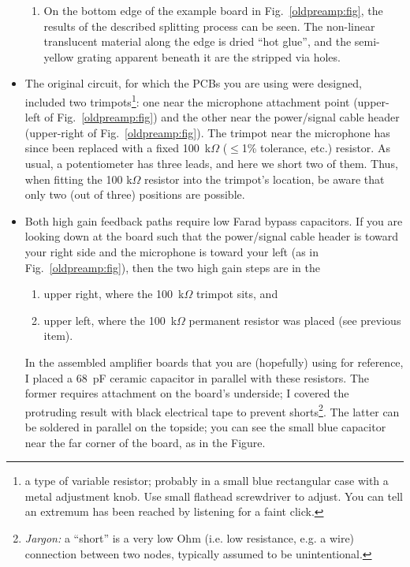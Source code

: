 \documentclass[letterpaper]{article}
\begin{document}
\begin{itemize}
\begin{enumerate}
\item On the bottom edge of the example board in
  Fig.~\ref{oldpreamp:fig}, the results of the described splitting
  process can be seen. The non-linear translucent material along the
  edge is dried ``hot glue'', and the semi-yellow grating apparent
  beneath it are the stripped via holes.
\end{enumerate}

\item The original circuit, for which the PCBs you are using were
  designed, included two trimpots\footnote{a type of variable
    resistor; probably in a small blue rectangular case with a metal
    adjustment knob. Use small flathead screwdriver to adjust. You can
    tell an extremum has been reached by listening for a faint
    click.}: one near the microphone attachment point (upper-left of
  Fig.~\ref{oldpreamp:fig}) and the other near the power/signal cable
  header (upper-right of Fig.~\ref{oldpreamp:fig}). The trimpot near
  the microphone has since been replaced with a fixed 100~k$\Omega$
  ($\leq$1\% tolerance, etc.)  resistor. As usual, a potentiometer has
  three leads, and here we short two of them. Thus, when fitting the
  100 k$\Omega$ resistor into the trimpot's location, be aware that
  only two (out of three) positions are possible.

\item Both high gain feedback paths require low Farad bypass
  capacitors. If you are looking down at the board such that the
  power/signal cable header is toward your right side and the
  microphone is toward your left (as in Fig.~\ref{oldpreamp:fig}),
  then the two high gain steps are in the
\begin{enumerate}
\item upper right, where the 100~k$\Omega$ trimpot sits, and

\item upper left, where the 100~k$\Omega$ permanent resistor was placed
  (see previous item).
\end{enumerate}
  In the assembled amplifier boards that you are (hopefully) using for
  reference, I placed a 68~pF ceramic capacitor in parallel with these
  resistors. The former requires attachment on the board's underside;
  I covered the protruding result with black electrical tape to
  prevent shorts\footnote{\textit{Jargon:} a ``short'' is a very low
    Ohm (i.e. low resistance, e.g. a wire) connection between two
    nodes, typically assumed to be unintentional.}. The latter can be
  soldered in parallel on the topside; you can see the small blue
  capacitor near the far corner of the board, as in the Figure.


\end{itemize}
\end{document}
